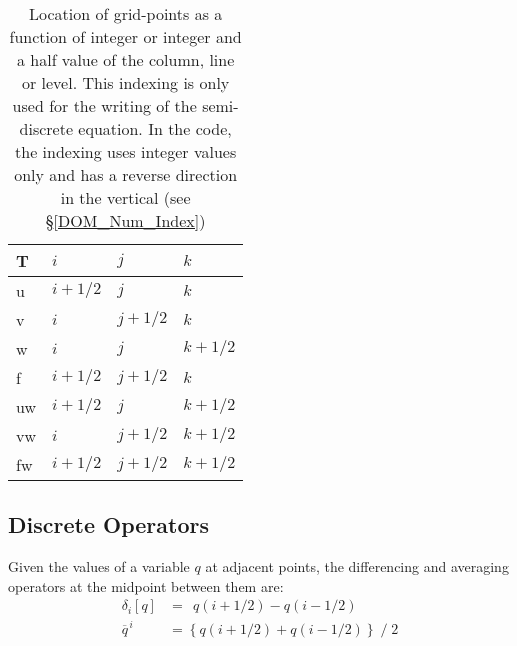 \documentclass[NEMO_book]{subfiles}
\begin{document}
\begin{table}[!tb]
\begin{center} \begin{tabular}{|p{46pt}|p{56pt}|p{56pt}|p{56pt}|}
\hline
T	&$i$ 		& $j$		& $k$		 \\ \hline
u	& $i+1/2$	& $j$		& $k$	 	\\ \hline
v	& $i$	 	& $j+1/2$	& $k$	 	\\ \hline
w	& $i$	 	& $j$		& $k+1/2$ 	\\ \hline
f	& $i+1/2$ 	& $j+1/2$	& $k$	 	\\ \hline
uw	& $i+1/2$ 	& $j$		& $k+1/2$ 	\\ \hline
vw	& $i$	 	& $j+1/2$	& $k+1/2$ 	\\ \hline
fw	& $i+1/2$ 	& $j+1/2$	& $k+1/2$ 	\\ \hline
\end{tabular}
\caption{ \label{Tab_cell}
Location of grid-points as a function of integer or integer and a half value of the column, 
line or level. This indexing is only used for the writing of the semi-discrete equation. 
In the code, the indexing uses integer values only and has a reverse direction 
in the vertical (see \S\ref{DOM_Num_Index})}
\end{center}
\end{table}

\subsection{Discrete Operators}
\label{DOM_operators}

Given the values of a variable $q$ at adjacent points, the differencing and 
averaging operators at the midpoint between them are:
\begin{subequations} \label{Eq_di_mi}
\begin{align}
 \delta _i [q]       &=  \  \    q(i+1/2)  - q(i-1/2)		\\
 \overline q^{\,i} &= \left\{ q(i+1/2) + q(i-1/2) \right\} \; / \; 2
\end{align}
\end{subequations}
\end{document}
